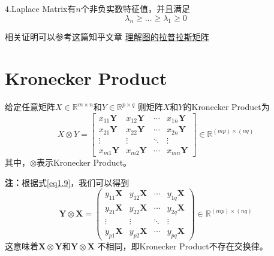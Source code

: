 \documentclass[lang=cn,10pt]{elegantbook}
\begin{document}
\textbf{$\mathit{4.}$}Laplace Matrix有$n$个非负实数特征值，并且满足
\begin{equation*}
	\lambda_n \ge \ldots \ge \lambda_1 \ge 0
\end{equation*}

相关证明可以参考这篇知乎文章
\href{https://zhuanlan.zhihu.com/p/362416124}{理解图的拉普拉斯矩阵}

\section{Kronecker Product}
\begin{definition}
	给定任意矩阵$X \in \mathbb{R}^{m \times n}$和$Y \in \mathbb{R}^{p \times q}$
	则矩阵$X$和$Y$的Kronecker Product为
	\begin{equation}\label{eq1.9}
		X\otimes Y = \begin{bmatrix}
			x_{11}\boldsymbol{Y} & x_{12}\boldsymbol{Y} & \cdots & x_{1n}\boldsymbol{Y} \\x_{21}\boldsymbol{Y}&x_{22}\boldsymbol{Y}&\cdots&x_{2n}\boldsymbol{Y}\\\vdots&\vdots&\ddots&\vdots\\x_{m1}\boldsymbol{Y}&x_{m2}\boldsymbol{Y}&\cdots&x_{mn}\boldsymbol{Y}
		\end{bmatrix}\in\mathbb{R}^{(mp)\times(nq)}
	\end{equation}
	其中，$\otimes$表示Kronecker Product。
\end{definition}
\textbf{注：}根据式\ref{eq1.9}，我们可以得到
\begin{equation*}
	\boldsymbol{Y}\otimes\boldsymbol{X}=
	\begin{pmatrix}
		y_{11}\boldsymbol{X} & y_{12}\boldsymbol{X} & \cdots & y_{1q}\boldsymbol{X} \\
		y_{21}\boldsymbol{X} & y_{22}\boldsymbol{X} & \cdots & y_{2q}\boldsymbol{X} \\
		\vdots               & \vdots               & \ddots & \vdots               \\
		y_{p1}\boldsymbol{X} & y_{p2}\boldsymbol{X} & \cdots & y_{pq}\boldsymbol{X}
	\end{pmatrix}
	\in\mathbb{R}^{(mp)\times(nq)}
\end{equation*}
这意味着$\boldsymbol{X}\otimes\boldsymbol{Y}$和$\boldsymbol{Y}\otimes\boldsymbol{X}$
不相同，即Kronecker Product不存在交换律。
\end{document}
